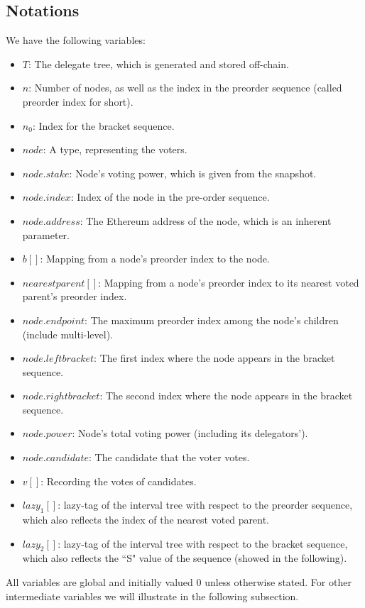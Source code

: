 \subsection{Notations}
We have the following variables:
\begin{itemize}
	\item $T$: The delegate tree, which is generated and stored off-chain. 
	\item $n$: Number of nodes, as well as the index in the preorder sequence (called preorder index for short). 
	\item $n_0$: Index for the bracket sequence. 
	\item $node$: A type, representing the voters. 
	\item $node.stake$: Node's voting power, which is given from the snapshot.
	\item $node.index$: Index of the node in the pre-order sequence.
	\item $node.address$: The Ethereum address of the node, which is an inherent  
	parameter.
	\item $b[]$: Mapping from a node's preorder index to the node.
	\item $nearestparent[]$: Mapping from a node's preorder index to its nearest voted parent's preorder index.
	\item $node.endpoint$: The maximum preorder index among the node's children (include multi-level).
	\item $node.leftbracket$: The first index where the node appears in the bracket sequence. 
	\item $node.rightbracket$: The second index where the node appears in the bracket sequence. 
	\item $node.power$: Node's total voting power (including its delegators').
	\item $node.candidate$: The candidate that the voter votes.
	\item $v[]$: Recording the votes of candidates.
	\item $lazy_1[]$: lazy-tag of the interval tree with respect to the preorder sequence, which also reflects the index of the nearest voted parent.
	\item $lazy_2[]$: lazy-tag of the interval tree with respect to the bracket sequence, which also reflects the ``S" value of the sequence (showed in the following).
\end{itemize}
All variables are global and initially valued 0 unless otherwise stated.  For other intermediate variables we will illustrate in the following subsection.
